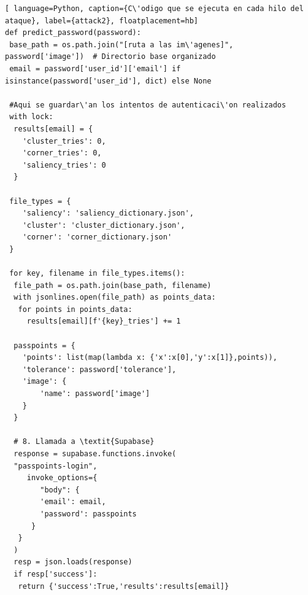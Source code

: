 \begin{lstlisting}[ language=Python, caption={C\'odigo que se ejecuta en cada hilo del ataque}, label={attack2}, floatplacement=hb]
def predict_password(password):
 base_path = os.path.join("[ruta a las im\'agenes]", password['image'])  # Directorio base organizado
 email = password['user_id']['email'] if isinstance(password['user_id'], dict) else None

 #Aqui se guardar\'an los intentos de autenticaci\'on realizados
 with lock:
  results[email] = {
	'cluster_tries': 0,
	'corner_tries': 0,
	'saliency_tries': 0
  }

 file_types = {
	'saliency': 'saliency_dictionary.json',
	'cluster': 'cluster_dictionary.json',
	'corner': 'corner_dictionary.json'	
 }

 for key, filename in file_types.items():
  file_path = os.path.join(base_path, filename)
  with jsonlines.open(file_path) as points_data:
   for points in points_data:
     results[email][f'{key}_tries'] += 1

  passpoints = {
	'points': list(map(lambda x: {'x':x[0],'y':x[1]},points)),
	'tolerance': password['tolerance'],
	'image': {
		'name': password['image']
	}
  }

  # 8. Llamada a \textit{Supabase}  
  response = supabase.functions.invoke(
  "passpoints-login",
     invoke_options={
    	"body": {
		'email': email,
		'password': passpoints
 	  }
   }
  )
  resp = json.loads(response)
  if resp['success']:
   return {'success':True,'results':results[email]}
\end{lstlisting}
